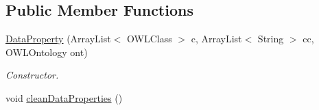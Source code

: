\subsection*{Public Member Functions}
\begin{DoxyCompactItemize}
\item 
\hyperlink{class_ontology_1_1_data_property_a2b6f27d096d62baa79eaef7b3909dccd}{DataProperty} (ArrayList$<$ OWLClass $>$ c, ArrayList$<$ String $>$ cc, OWLOntology ont)
\begin{DoxyCompactList}\small\item\em Constructor. \end{DoxyCompactList}\item 
\hypertarget{class_ontology_1_1_data_property_a51849b588f7a80bb59fba215a06c54df}{
void \hyperlink{class_ontology_1_1_data_property_a51849b588f7a80bb59fba215a06c54df}{cleanDataProperties} ()}
\label{class_ontology_1_1_data_property_a51849b588f7a80bb59fba215a06c54df}


\end{DoxyCompactItemize}
